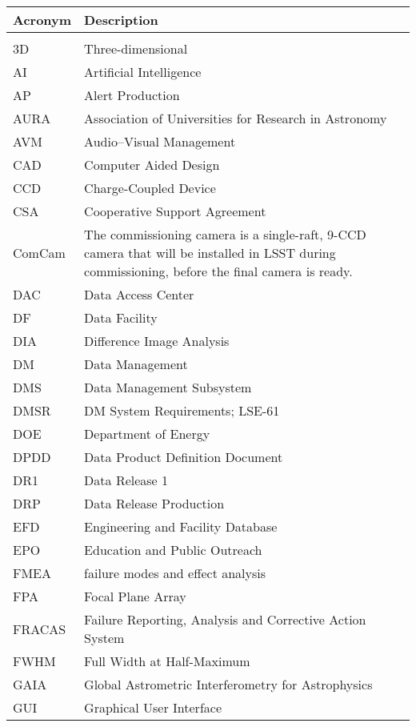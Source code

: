 \addtocounter{table}{-1}
\begin{longtable}{p{}p{}}\hline
\textbf{Acronym} & \textbf{Description}  \\\hline

 &  \\\hline
3D & Three-dimensional \\\hline
AI & Artificial Intelligence \\\hline
AP & Alert Production \\\hline
AURA & Association of Universities for Research in Astronomy \\\hline
AVM & Audio--Visual Management \\\hline
CAD & Computer Aided Design \\\hline
CCD & Charge-Coupled Device \\\hline
CSA & Cooperative Support Agreement \\\hline
ComCam & The commissioning camera is a single-raft, 9-CCD camera that will be installed in LSST during commissioning, before the final camera is ready. \\\hline
DAC & Data Access Center \\\hline
DF & Data Facility \\\hline
DIA & Difference Image Analysis \\\hline
DM & Data Management \\\hline
DMS & Data Management Subsystem \\\hline
DMSR & DM System Requirements; LSE-61 \\\hline
DOE & Department of Energy \\\hline
DPDD & Data Product Definition Document \\\hline
DR1 & Data Release 1 \\\hline
DRP & Data Release Production \\\hline
EFD & Engineering and Facility Database \\\hline
EPO & Education and Public Outreach \\\hline
FMEA & failure modes and effect analysis \\\hline
FPA & Focal Plane Array \\\hline
FRACAS & Failure Reporting, Analysis and Corrective Action System \\\hline
FWHM & Full Width at Half-Maximum \\\hline
GAIA & Global Astrometric Interferometry for Astrophysics \\\hline
GUI & Graphical User Interface \\\hline

\end{longtable}

